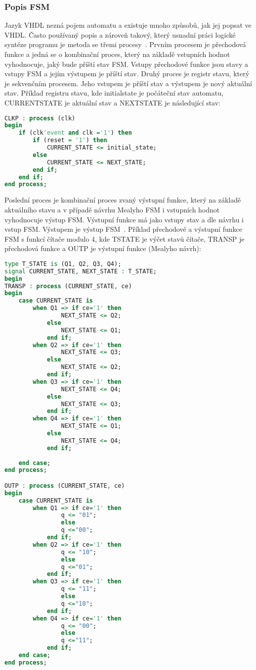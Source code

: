 \documentclass{report}
\begin{document}
\subsubsection{Popis FSM}
Jazyk VHDL nezná pojem automatu a existuje mnoho způsobů, jak jej popsat ve VHDL. Často používaný popis a zároveň takový, který usnadní práci logické syntéze programu je metoda se třemi procesy~\cite{vhdlII}. Prvním procesem je přechodová funkce a jedná se o kombinační proces, který na základě vstupních hodnot vyhodnocuje, jaký bude příští stav FSM. Vstupy přechodové funkce jsou stavy a vstupy FSM a jejím výstupem je příští stav. Druhý proces je registr stavu, který je sekvenčním procesem. Jeho vstupem je příští stav a výstupem je nový aktuální stav. Příklad registru stavu, kde initial\textunderscore state je počáteční stav automatu, CURRENT\textunderscore STATE je aktuální stav a NEXT\textunderscore STATE je následující stav:
\begin{lstlisting}[language=VHDL]
CLKP : process (clk)
begin 
	if (clk'event and clk ='1') then 
		if (reset = '1') then
			CURRENT_STATE <= initial_state;
		else 
			CURRENT_STATE <= NEXT_STATE;
		end if;
	end if;
end process;
\end{lstlisting} 
Poslední proces je kombinační proces zvaný výstupní funkce, který na základě aktuálního stavu a v případě návrhu Mealyho FSM i vstupních hodnot vyhodnocuje výstup FSM. Výstupní funkce má jako vstupy stav a dle návrhu i vstup FSM. Výstupem je výstup FSM~\cite{vhdlII}. Příklad přechodové a výstupní funkce FSM s funkcí čítače modulo 4, kde T\textunderscore STATE je výčet stavů čítače, TRANSP je přechodová funkce a OUTP je výstupní funkce (Mealyho návrh):
\begin{lstlisting}[language=VHDL]
type T_STATE is (Q1, Q2, Q3, Q4);
signal CURRENT_STATE, NEXT_STATE : T_STATE;
begin
TRANSP : process (CURRENT_STATE, ce) 
begin 
	case CURRENT_STATE is 
		when Q1 => if ce='1' then 
				NEXT_STATE <= Q2;
			else 
				NEXT_STATE <= Q1;
			end if;
		when Q2 => if ce='1' then 
				NEXT_STATE <= Q3;
			else 
				NEXT_STATE <= Q2;
			end if;
		when Q3 => if ce='1' then 
				NEXT_STATE <= Q4;
			else 
				NEXT_STATE <= Q3;
			end if;
		when Q4 => if ce='1' then 
				NEXT_STATE <= Q1;
			else 
				NEXT_STATE <= Q4;
			end if;
		
	end case;
end process;

OUTP : process (CURRENT_STATE, ce)
begin
	case CURRENT_STATE is 
		when Q1 => if ce='1' then 
				q <= "01";
				else
				q <="00";
			end if;
		when Q2 => if ce='1' then 
				q <= "10";
				else
				q <="01";
			end if;
		when Q3 => if ce='1' then 
				q <= "11";
				else
				q <="10";
			end if;
		when Q4 => if ce='1' then 
				q <= "00";
				else
				q <="11";
			end if;
	end case;
end process;
\end{lstlisting} 
\end{document}
